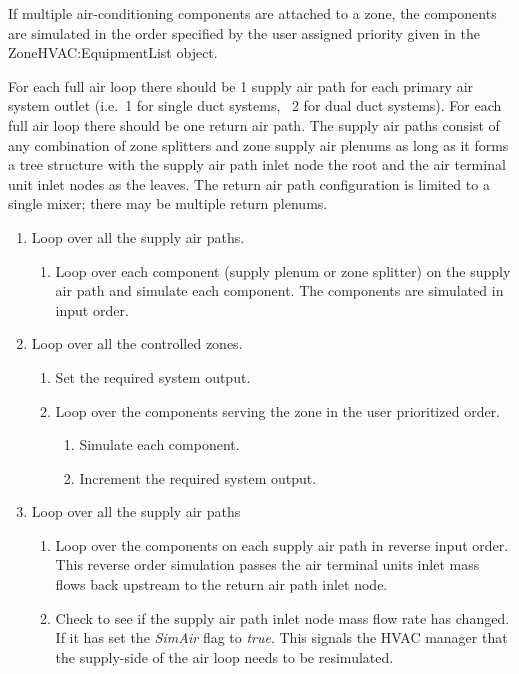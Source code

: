 If multiple air-conditioning components are attached to a zone, the components are simulated in the order specified by the user assigned priority given in the ZoneHVAC:EquipmentList object.

For each full air loop there should be 1 supply air path for each primary air system outlet (i.e.~1 for single duct systems,~ 2 for dual duct systems). For each full air loop there should be one return air path. The supply air paths consist of any combination of zone splitters and zone supply air plenums as long as it forms a tree structure with the supply air path inlet node the root and the air terminal unit inlet nodes as the leaves. The return air path configuration is limited to a single mixer; there may be multiple return plenums.

\begin{enumerate}
  \item
    Loop over all the supply air paths.
    \begin{enumerate}
      \item
        Loop over each component (supply plenum or zone splitter) on the supply air path and simulate each component. The components are simulated in input order.
    \end{enumerate}
  \item
    Loop over all the controlled zones.
    \begin{enumerate}
      \item
        Set the required system output.
      \item
        Loop over the components serving the zone in the user prioritized order.
        \begin{enumerate}
          \item
            Simulate each component.
          \item
            Increment the required system output.
        \end{enumerate}
    \end{enumerate}
  \item
    Loop over all the supply air paths
    \begin{enumerate}
      \item
        Loop over the components on each supply air path in reverse input order. This reverse order simulation passes the air terminal units inlet mass flows back upstream to the return air path inlet node.
      \item
        Check to see if the supply air path inlet node mass flow rate has changed. If it has set the \emph{SimAir} flag to \emph{true}. This signals the HVAC manager that the supply-side of the air loop needs to be resimulated.

\end{enumerate}
\end{enumerate}

